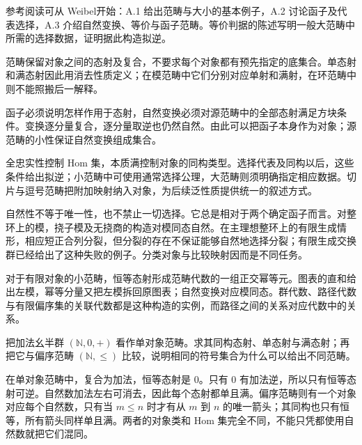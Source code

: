 \ProseParagraphBreak
参考阅读可从 Weibel\cite[Sections A.1--A.3, pp. 417--424]{Weibel1994HomologicalAlgebra}开始：A.1 给出范畴与大小的基本例子，A.2 讨论函子及代表选择，A.3 介绍自然变换、等价与函子范畴。等价判据的陈述写明一般大范畴中所需的选择数据，证明据此构造拟逆。







\begin{chaptersummary}
	范畴保留对象之间的态射及复合，不要求每个对象都有预先指定的底集合。单态射和满态射因此用消去性质定义；在模范畴中它们分别对应单射和满射，在环范畴中则不能照搬后一解释。

	\ProseParagraphBreak
	函子必须说明怎样作用于态射，自然变换必须对源范畴中的全部态射满足方块条件。变换逐分量复合，逐分量取逆也仍然自然。由此可以把函子本身作为对象；源范畴的小性保证自然变换组成集合。

	\ProseParagraphBreak
	全忠实性控制 Hom 集，本质满控制对象的同构类型。选择代表及同构以后，这些条件给出拟逆；小范畴中可使用通常选择公理，大范畴则须明确指定相应数据。切片与逗号范畴把附加映射纳入对象，为后续泛性质提供统一的叙述方式。

	\ProseParagraphBreak
	自然性不等于唯一性，也不禁止一切选择。它总是相对于两个确定函子而言。对整环上的模，挠子模及无挠商的构造对模同态自然。在主理想整环上的有限生成情形，相应短正合列分裂，但分裂的存在不保证能够自然地选择分裂；有限生成交换群已经给出了这种失败的例子。分类对象与比较映射因而是不同任务。

	\ProseParagraphBreak
	对于有限对象的小范畴，恒等态射形成范畴代数的一组正交幂等元。图表的直和给出左模，幂等分量又把左模拆回原图表；自然变换对应模同态。群代数、路径代数与有限偏序集的关联代数都是这种构造的实例，而路径之间的关系对应代数中的关系。
\end{chaptersummary}

\BookExercises

\begin{exercise}\label{b4:ex:01-additive-monoid-category}
	把加法幺半群 \((\mathbb N,0,+)\) 看作单对象范畴。求其同构态射、单态射与满态射；再把它与偏序范畴 \((\mathbb N,\le)\) 比较，说明相同的符号集合为什么可以给出不同范畴。
\end{exercise}
\begin{solution}
	在单对象范畴中，复合为加法，恒等态射是 \(0\)。只有 \(0\) 有加法逆，所以只有恒等态射可逆。自然数加法左右可消去，因此每个态射都单且满。偏序范畴则有一个对象对应每个自然数，只有当 \(m\le n\) 时才有从 \(m\) 到 \(n\) 的唯一箭头；其同构也只有恒等，所有箭头同样单且满。两者的对象类和 Hom 集完全不同，不能只凭都使用自然数就把它们混同。
\end{solution}

